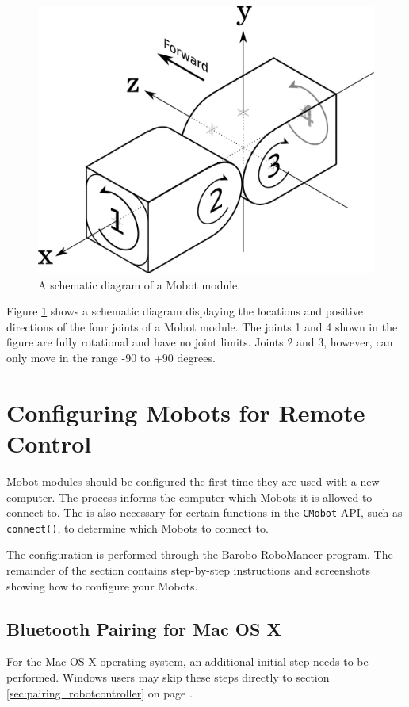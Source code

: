 \documentclass{article}
\begin{document}
\begin{figure}[H]
\begin{center}
\includegraphics[width=4.5in]{images/joint_diagram_verbose.png}
\end{center}
\caption{\label{fig:joint_diagram_verbose.png} A schematic diagram of a Mobot module.}
\end{figure}

Figure \ref{fig:joint_diagram_verbose.png} shows a schematic diagram displaying the
locations and positive directions of the four joints of a Mobot module. The
joints 1 and 4 shown in the figure are fully rotational and have no joint limits.
Joints 2 and 3, however, can only move in the range -90 to +90 degrees.

\section{\label{sec:pairing}Configuring Mobots for Remote Control}
Mobot modules should be configured the first time they are used with 
a new computer. The process informs the computer which Mobots it
is allowed to connect to. The is also necessary for certain 
functions in the \texttt{CMobot} API, such as \texttt{connect()},
to determine which Mobots to connect to.

The configuration is performed through the Barobo RoboMancer
program. The remainder of the section contains step-by-step instructions
and screenshots showing how to configure your Mobots.

\subsection{Bluetooth Pairing for Mac OS X}
For the Mac OS X operating system, an additional initial step needs to be performed.
Windows users may skip these steps directly to section \ref{sec:pairing_robotcontroller}
on page \pageref{sec:pairing_robotcontroller}.
\end{document}
